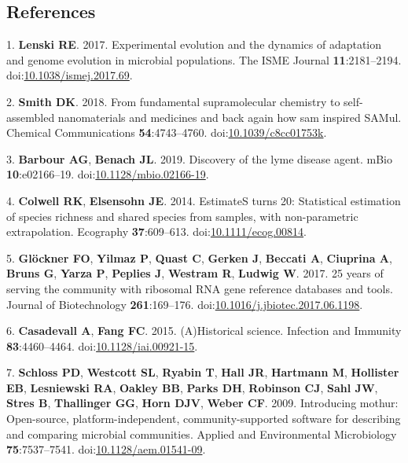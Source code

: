 \documentclass[11pt,]{article}
\begin{document}
\newpage

\hypertarget{references}{%
\subsection{References}\label{references}}

\hypertarget{refs}{}
\leavevmode\hypertarget{ref-Lenski2017}{}%
1. \textbf{Lenski RE}. 2017. Experimental evolution and the dynamics of
adaptation and genome evolution in microbial populations. The ISME
Journal \textbf{11}:2181--2194.
doi:\href{https://doi.org/10.1038/ismej.2017.69}{10.1038/ismej.2017.69}.

\leavevmode\hypertarget{ref-Smith2018}{}%
2. \textbf{Smith DK}. 2018. From fundamental supramolecular chemistry to
self-assembled nanomaterials and medicines and back again how sam
inspired SAMul. Chemical Communications \textbf{54}:4743--4760.
doi:\href{https://doi.org/10.1039/c8cc01753k}{10.1039/c8cc01753k}.

\leavevmode\hypertarget{ref-Barbour2019}{}%
3. \textbf{Barbour AG}, \textbf{Benach JL}. 2019. Discovery of the lyme
disease agent. mBio \textbf{10}:e02166--19.
doi:\href{https://doi.org/10.1128/mbio.02166-19}{10.1128/mbio.02166-19}.

\leavevmode\hypertarget{ref-Colwell2014}{}%
4. \textbf{Colwell RK}, \textbf{Elsensohn JE}. 2014. EstimateS turns 20:
Statistical estimation of species richness and shared species from
samples, with non-parametric extrapolation. Ecography
\textbf{37}:609--613.
doi:\href{https://doi.org/10.1111/ecog.00814}{10.1111/ecog.00814}.

\leavevmode\hypertarget{ref-Glckner2017}{}%
5. \textbf{Glöckner FO}, \textbf{Yilmaz P}, \textbf{Quast C},
\textbf{Gerken J}, \textbf{Beccati A}, \textbf{Ciuprina A},
\textbf{Bruns G}, \textbf{Yarza P}, \textbf{Peplies J}, \textbf{Westram
R}, \textbf{Ludwig W}. 2017. 25 years of serving the community with
ribosomal RNA gene reference databases and tools. Journal of
Biotechnology \textbf{261}:169--176.
doi:\href{https://doi.org/10.1016/j.jbiotec.2017.06.1198}{10.1016/j.jbiotec.2017.06.1198}.

\leavevmode\hypertarget{ref-Casadevall2015}{}%
6. \textbf{Casadevall A}, \textbf{Fang FC}. 2015. (A)Historical science.
Infection and Immunity \textbf{83}:4460--4464.
doi:\href{https://doi.org/10.1128/iai.00921-15}{10.1128/iai.00921-15}.

\leavevmode\hypertarget{ref-Schloss2009a}{}%
7. \textbf{Schloss PD}, \textbf{Westcott SL}, \textbf{Ryabin T},
\textbf{Hall JR}, \textbf{Hartmann M}, \textbf{Hollister EB},
\textbf{Lesniewski RA}, \textbf{Oakley BB}, \textbf{Parks DH},
\textbf{Robinson CJ}, \textbf{Sahl JW}, \textbf{Stres B},
\textbf{Thallinger GG}, \textbf{Horn DJV}, \textbf{Weber CF}. 2009.
Introducing mothur: Open-source, platform-independent,
community-supported software for describing and comparing microbial
communities. Applied and Environmental Microbiology
\textbf{75}:7537--7541.
doi:\href{https://doi.org/10.1128/aem.01541-09}{10.1128/aem.01541-09}.
\end{document}
